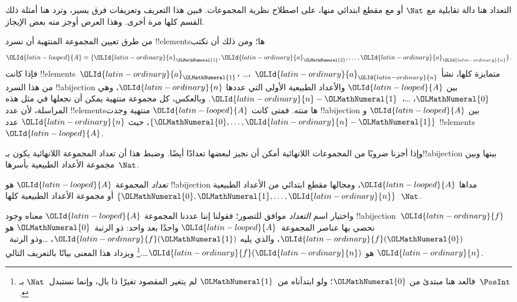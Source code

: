\documentclass[../../../include/open-logic-section]{subfiles}
\begin{document}


\begin{editorial}
التعداد هنا دالة تقابلية مع $\Nat$ أو مع مقطع ابتدائي منها، على اصطلاح نظرية المجموعات. فبين هذا التعريف وتعريفات  فرق يسير، وترد هنا أمثلة ذلك القسم كلها مرة أخرى. وهذا العرض أوجز منه بعض الإيجاز.
\end{editorial}

من طرق تعيين المجموعة المنتهية أن نسرد !!{element}sها؛ ومن ذلك أن نكتب
\[
  {\OLId{latin-looped}{A}} = \{{\OLId{latin-ordinary}{a}}_{\OLMathNumeral{1}}, {\OLId{latin-ordinary}{a}}_{\OLMathNumeral{2}}, \ldots, {\OLId{latin-ordinary}{a}}_{\OLId{latin-ordinary}{n}}\}.
\]
فإذا كانت !!{element}s~${\OLId{latin-ordinary}{a}}_{\OLMathNumeral{1}}$، \dots،~${\OLId{latin-ordinary}{a}}_{\OLId{latin-ordinary}{n}}$ متمايزة كلها، نشأ من هذا السرد !!a{bijection} بين ${\OLId{latin-looped}{A}}$ والأعداد الطبيعية الأولى التي عددها ${\OLId{latin-ordinary}{n}}$، وهي ${\OLMathNumeral{0}}$، \dots،~${\OLId{latin-ordinary}{n}}-{\OLMathNumeral{1}}$. وبالعكس، كل مجموعة منتهية يمكن أن نجعلها في مثل هذه المراسلة، لأن عدد !!{element}sها منته. فمتى كانت ${\OLId{latin-looped}{A}}$ منتهية وجدت !!a{bijection} بين ${\OLId{latin-looped}{A}}$ و$\{{\OLMathNumeral{0}}, \dots, {\OLId{latin-ordinary}{n}}-{\OLMathNumeral{1}}\}$، حيث ${\OLId{latin-ordinary}{n}}$ عدد !!{element}s~${\OLId{latin-looped}{A}}$.

وإذا أجزنا ضروبًا من المجموعات اللانهائية أمكن أن نجيز لبعضها تعدادًا أيضًا. وضبط هذا أن تعداد المجموعة اللانهائية يكون بـ!!a{bijection} بينها وبين مجموعة الأعداد الطبيعية بأسرها~$\Nat$.

\begin{defn}
\emph{تعداد} المجموعة ${\OLId{latin-looped}{A}}$ هو !!a{bijection} مداها ${\OLId{latin-looped}{A}}$، ومجالها مقطع ابتدائي من الأعداد الطبيعية $\{{\OLMathNumeral{0}}, {\OLMathNumeral{1}}, \ldots, {\OLId{latin-ordinary}{n}}\}$ {أو} مجموعة الأعداد الطبيعية كلها~$\Nat$.
\end{defn}

\begin{explain}
واختيار اسم \emph{التعداد} موافق للتصور؛ فقولنا إننا عددنا المجموعة ${\OLId{latin-looped}{A}}$ معناه وجود !!a{bijection}~${\OLId{latin-ordinary}{f}}$ نحصي بها عناصر المجموعة~${\OLId{latin-looped}{A}}$ واحدًا بعد واحد: ذو الرتبة~${\OLMathNumeral{0}}$ هو ${\OLId{latin-ordinary}{f}}({\OLMathNumeral{0}})$، والذي يليه ${\OLId{latin-ordinary}{f}}({\OLMathNumeral{1}})$، \ldots وذو الرتبة~${\OLId{latin-ordinary}{n}}$ هو ${\OLId{latin-ordinary}{f}}({\OLId{latin-ordinary}{n}})$\ldots.\footnote{فالعد هنا مبتدئ من ${\OLMathNumeral{0}}$؛ ولو ابتدأناه من~${\OLMathNumeral{1}}$ لم يتغير المقصود تغيرًا ذا بال، وإنما نستبدل~$\Nat$ بـ~$\PosInt$.} ويزداد هذا المعنى بيانًا بالتعريف التالي.
\end{explain}
\end{document}
